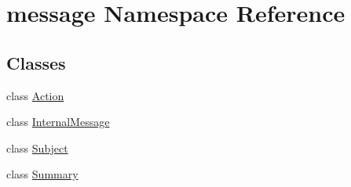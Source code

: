 \hypertarget{namespacemessage}{}\section{message Namespace Reference}
\label{namespacemessage}
\subsection*{Classes}
\begin{DoxyCompactItemize}
\item 
class \hyperlink{classmessage_1_1Action}{Action}
\item 
class \hyperlink{classmessage_1_1InternalMessage}{Internal\+Message}
\item 
class \hyperlink{classmessage_1_1Subject}{Subject}
\item 
class \hyperlink{classmessage_1_1Summary}{Summary}
\end{DoxyCompactItemize}
